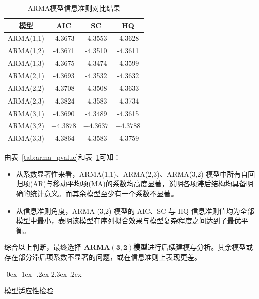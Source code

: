 \documentclass[12pt,a4paper]{ctexart}
\makeatletter
\renewcommand{\section}{\@startsection{section}{1}{\z@}%
{-0ex \@plus -1ex \@minus -.2ex}%
{2.3ex \@plus.2ex}%
{\normalfont\Large\bfseries\raggedright}}
\makeatother
\begin{document}
\begin{table}[H]
\centering
\caption{ARMA模型信息准则对比结果}
\label{tab:arma_criteria}
\begin{tabular}{cccc}
\toprule[1.2pt]
模型 & AIC & SC & HQ \\
\midrule[0.75pt]
ARMA(1,1) & -4.3673 & -4.3553 & -4.3628 \\
ARMA(1,2) & -4.3671 & -4.3510 & -4.3611 \\
ARMA(1,3) & -4.3675 & -4.3474 & -4.3599 \\
ARMA(2,1) & -4.3693 & -4.3532 & -4.3632 \\
ARMA(2,2) & -4.3708 & -4.3508 & -4.3633 \\
ARMA(2,3) & -4.3824 & -4.3583 & -4.3734 \\
ARMA(3,1) & -4.3690 & -4.3489 & -4.3615 \\
ARMA(3,2) & $\mathbf{-4.3878}$ & $\mathbf{-4.3637}$ & $\mathbf{-4.3788}$ \\
ARMA(3,3) & -4.3864 & -4.3583 & -4.3759 \\
\bottomrule[1.2pt]
\end{tabular}
\end{table}
由表~\ref{tab:arma_pvalue}和表~\ref{tab:arma_criteria}可知：
\begin{itemize}
\item 从系数显著性来看，ARMA(1,1)、ARMA(2,3)、ARMA(3,2) 模型中所有自回归项(AR)与移动平均项(MA)的系数均高度显著，说明各项滞后结构均具备明确的统计意义。而其余模型至少有一个系数不显著。

\item 从信息准则角度，ARMA (3,2) 模型的 AIC、SC 与 HQ 信息准则值均为全部模型中最小，表明该模型在序列拟合效果与模型复杂程度之间达到了最优平衡。
\end{itemize}
综合以上判断，最终选择 $\mathbf{ARMA}(\mathbf{3},\mathbf{2})$\textbf{模型}进行后续建模与分析。其余模型或存在部分滞后项系数不显著的问题，或在信息准则上表现更差。


\section{模型适应性检验}
\end{document}
